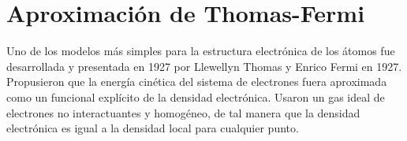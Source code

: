 \section{Aproximación de Thomas-Fermi}

Uno de los modelos más simples para la estructura electrónica de los átomos fue desarrollada y presentada en 1927 por Llewellyn Thomas y Enrico Fermi en 1927. Propusieron que la energía cinética del sistema de electrones fuera aproximada como un funcional explícito de la densidad electrónica. Usaron un gas ideal de electrones no interactuantes y homogéneo, de tal manera que la densidad electrónica es igual a la densidad local para cualquier punto.
